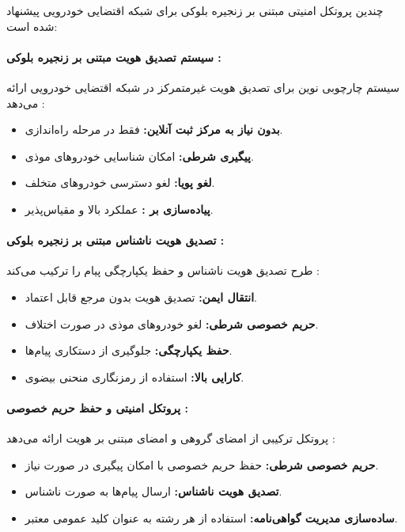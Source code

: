 \documentclass[12pt,a4paper]{article}
\begin{document}
چندین پروتکل امنیتی مبتنی بر زنجیره بلوکی برای شبکه اقتضایی خودرویی پیشنهاد شده است:

\paragraph{سیستم تصدیق هویت مبتنی بر زنجیره بلوکی :}
سیستم  چارچوبی نوین برای تصدیق هویت غیرمتمرکز در شبکه اقتضایی خودرویی ارائه می‌دهد \cite{fengBPASBlockchainAssistedPrivacyPreserving2020}:

\begin{itemize}
  \item \textbf{بدون نیاز به مرکز ثبت آنلاین:} فقط در مرحله راه‌اندازی.
  \item \textbf{پیگیری شرطی:} امکان شناسایی خودروهای موذی.
  \item \textbf{لغو پویا:} لغو دسترسی خودروهای متخلف.
  \item \textbf{پیاده‌سازی بر :} عملکرد بالا و مقیاس‌پذیر.
\end{itemize}

\paragraph{تصدیق هویت ناشناس مبتنی بر زنجیره بلوکی :}
طرح  تصدیق هویت ناشناس و حفظ یکپارچگی پیام را ترکیب می‌کند \cite{mariaBAIVEfficientBlockchainBased2022}:

\begin{itemize}
  \item \textbf{انتقال ایمن:} تصدیق هویت بدون مرجع قابل اعتماد.
  \item \textbf{حریم خصوصی شرطی:} لغو خودروهای موذی در صورت اختلاف.
  \item \textbf{حفظ یکپارچگی:} جلوگیری از دستکاری پیام‌ها.
  \item \textbf{کارایی بالا:} استفاده از رمزنگاری منحنی بیضوی.
\end{itemize}

\paragraph{پروتکل امنیتی و حفظ حریم خصوصی :}
پروتکل  ترکیبی از امضای گروهی و امضای مبتنی بر هویت ارائه می‌دهد \cite{linGSISSecurePrivacyPreserving2007}:

\begin{itemize}
  \item \textbf{حریم خصوصی شرطی:} حفظ حریم خصوصی با امکان پیگیری در صورت نیاز.
  \item \textbf{تصدیق هویت ناشناس:} ارسال پیام‌ها به صورت ناشناس.
  \item \textbf{ساده‌سازی مدیریت گواهی‌نامه:} استفاده از هر رشته به عنوان کلید عمومی معتبر.
\end{itemize}
\end{document}
